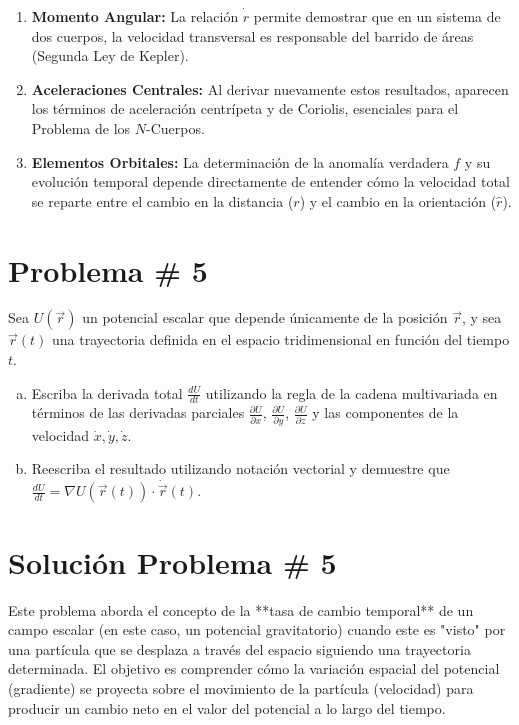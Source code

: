\documentclass[a4paper]{article}
\begin{document}
\begin{enumerate}
    \item \textbf{Momento Angular:} La relación $\dot{\hat{r}}$ permite demostrar que en un sistema de dos cuerpos, la velocidad transversal es responsable del barrido de áreas (Segunda Ley de Kepler).
    \item \textbf{Aceleraciones Centrales:} Al derivar nuevamente estos resultados, aparecen los términos de aceleración centrípeta y de Coriolis, esenciales para el Problema de los $N$-Cuerpos.
    \item \textbf{Elementos Orbitales:} La determinación de la anomalía verdadera $f$ y su evolución temporal depende directamente de entender cómo la velocidad total se reparte entre el cambio en la distancia ($r$) y el cambio en la orientación ($\hat{r}$).
\end{enumerate}


\section{Problema \# 5}

Sea $U(\vec{r})$ un potencial escalar que depende únicamente de la posición $\vec{r}$, y sea $\vec{r}(t)$ una trayectoria definida en el espacio tridimensional en función del tiempo $t$.

\begin{enumerate}[a)]
    \item Escriba la derivada total $\frac{dU}{dt}$ utilizando la regla de la cadena multivariada en términos de las derivadas parciales $\frac{\partial U}{\partial x}$, $\frac{\partial U}{\partial y}$, $\frac{\partial U}{\partial z}$ y las componentes de la velocidad $\dot{x}, \dot{y}, \dot{z}$.
    \item Reescriba el resultado utilizando notación vectorial y demuestre que $\frac{dU}{dt} = \nabla U(\vec{r}(t)) \cdot \dot{\vec{r}}(t)$.
\end{enumerate}

\section*{Solución Problema \# 5}

Este problema aborda el concepto de la **tasa de cambio temporal** de un campo escalar (en este caso, un potencial gravitatorio) cuando este es "visto" por una partícula que se desplaza a través del espacio siguiendo una trayectoria determinada. El objetivo es comprender cómo la variación espacial del potencial (gradiente) se proyecta sobre el movimiento de la partícula (velocidad) para producir un cambio neto en el valor del potencial a lo largo del tiempo.
\end{document}

